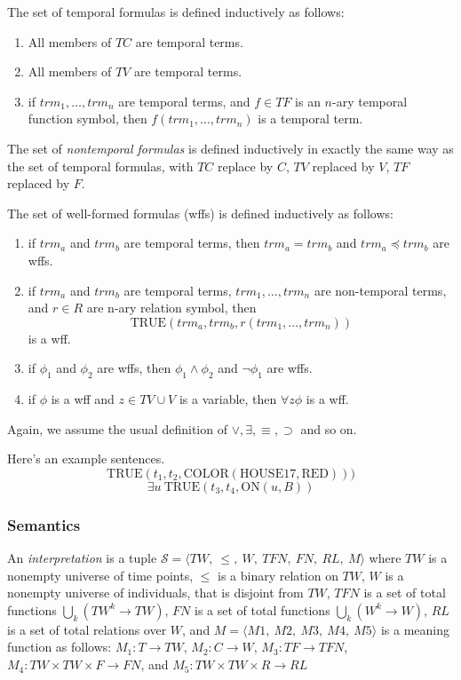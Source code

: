 The set of temporal formulas is defined inductively as follows:
\begin{enumerate}
	\item All members of $TC$ are temporal terms.
	\item All members of $TV$ are temporal terms.
	\item if $trm_1, \dots, trm_n$ are temporal terms, and $f \in TF$ is an $n$-ary temporal function symbol, then $f(trm_1, \dots, trm_n)$ is a temporal term.
\end{enumerate}

The set of \textit{nontemporal formulas} is defined inductively in exactly the same way as the set of temporal formulas, with
$TC$ replace by $C$, $TV$ replaced by $V$, $TF$ replaced by $F$.

The set of well-formed formulas (wffs) is defined inductively as follows:
\begin{enumerate}
	\item if $trm_a$ and $trm_b$ are temporal terms, then $trm_a = trm_b$ and $trm_a \preceq trm_b$ are wffs.
	\item if $trm_a$ and $trm_b$ are temporal terms, $trm_1, \dots, trm_n$ are non-temporal terms, and $r \in R$ are n-ary relation symbol,
	      then
	      \[
		      \text{TRUE}(trm_a, trm_b, r(trm_1, \dots, trm_n))
	      \]
	      is a wff.
	\item if $\phi_1$ and $\phi_2$ are wffs, then $\phi_1 \land \phi_2$ and $\neg \phi_1$ are wffs.
	\item if $\phi$ is a wff and $z \in TV \cup V$ is a variable, then $\forall z \phi$ is a wff.
\end{enumerate}

Again, we assume the usual definition of $\lor, \exists, \equiv, \supset$ and so on.

\begin{exmp} Here's an example sentences.
	\begin{equation}
		\text{TRUE}(t_1, t_2, \text{COLOR}(\text{HOUSE17}, \text{RED})))
	\end{equation}
	\begin{equation}
		\exists u \ \text{TRUE}(t_3, t_4, \text{ON}(u,B))
	\end{equation}
\end{exmp}

\subsubsection{Semantics}
An \textit{interpretation} is a tuple $\mathscr{S} = \langle  TW,\ \leqslant,\ W,\ TFN,\ FN,\ RL,\ M\rangle$ where $TW$
is a nonempty universe of time points, $\leqslant$ is a binary relation on $TW$, $W$ is a nonempty universe of individuals,
that is disjoint from $TW$, $TFN$ is a set of total functions $\bigcup_k (TW^k \rightarrow TW)$,
$FN$ is a set of total functions $ \bigcup_k (W^k \rightarrow W)$, $RL$ is a set of total relations over $W$, and
$M = \langle M1,\ M2,\ M3,\ M4,\ M5 \rangle$ is a meaning function as follows: $M_1 : T \rightarrow TW$,
$M_2: C \to W$, $M_3 : TF \to TFN$, $M_4 : TW \times TW \times F \to FN$, and $M_5: TW \times TW \times R \to RL$

